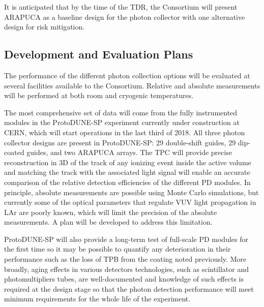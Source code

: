 It is anticipated that by the time of the TDR, the Consortium will present ARAPUCA as a baseline design for the photon collector with one alternative design for risk mitigation.  


\subsection{Development and Evaluation Plans}

The performance of the different photon collection options will be evaluated at several facilities available to the Consortium. 
Relative and absolute measurements will be performed at both room and cryogenic temperatures.

The most comprehensive set of data will come from the fully instrumented modules in the ProtoDUNE-SP experiment currently 
under construction at CERN, which will start operations in the last third of \num{2018}.
All  three photon collector designs are present in ProtoDUNE-SP: \num{29} 
double-shift guides, \num{29} dip-coated guides, and two ARAPUCA arrays. 
The TPC will provide precise reconstruction in 3D of the track of any ionizing event inside the active volume and matching  
the track with the associated light signal will enable an accurate comparison of the relative detection efficiencies of the different PD modules. 
In principle, absolute measurements are possible using Monte Carlo simulations, but currently some of the optical parameters that 
regulate VUV light propagation in LAr are poorly known,
which will limit the precision of the absolute  measurements. 
A plan will be developed to address this limitation.

ProtoDUNE-SP will also provide a long-term test of full-scale PD modules for the first time so it may be possible to quantify any deterioration in their performance such as the loss of TPB from the coating noted previously. 
More broadly, aging effects in various detectors technologies, such as scintillator and photomultipliers tubes, are well-documented and knowledge of such effects is required at the design stage so that the photon detection performance will meet minimum requirements for the whole life of the experiment.

